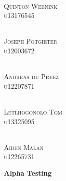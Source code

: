 \documentclass{article}
\begin{document}
\begin{titlepage}
\begin{center}
\begin{multicols}{2}
	\columnbreak
	
	\textsc{\large\\
		Quinton Weenink\\
		u13176545\\
	}
	
	\textsc{\large\\
		Joseph Potgieter\\
		u12003672\\
	}
	
	\textsc{\large\\
		Andreas du Preez\\
		u12207871\\
	}
	
	\textsc{\large\\
		Letlhogonolo Tom\\
		u13325095\\
	}
	
	\textsc{\large\\
		Aiden Malan\\
		u12265731\\
	}
					
	\end{multicols}
	
	\end{center}
\end{titlepage}

\tableofcontents
\thispagestyle{empty}
\cleardoublepage

\setcounter{page}{1}

   \vspace*{\fill}
   \begin{center}
	\Huge \textbf{Alpha Testing}
   \end{center}
   \vspace*{\fill}
\end{document}
